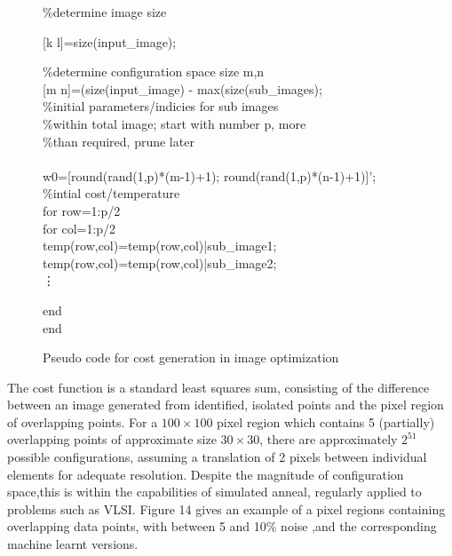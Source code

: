 \documentclass[12pt]{article}
\begin{document}
\begin{figure}
{\tt

\%determine image size

[k l]=size(input\_image);

\%determine configuration space size m,n\\

 [m n]=(size(input\_image) - max(size(sub\_images); \\

 
\%initial parameters/indicies for sub images \\
\%within total image; start with number p, more\\
\%than required, prune later\\
\\
w0=[round(rand(1,p)*(m-1)+1); round(rand(1,p)*(n-1)+1)]';\\

\%intial cost/temperature\\

for row=1:p/2 \\
	for col=1:p/2 \\

temp(row,col)=temp(row,col)|sub\_image1; \\
temp(row,col)=temp(row,col)|sub\_image2; \\
\vdots

end \\
end \\
}
\caption{Pseudo code for cost generation in image optimization}
\end{figure}






The cost function is a standard least squares sum, consisting of the difference between an image generated from identified, isolated points and the pixel region of overlapping points. For a $100\times 100$ pixel region which contains 5 (partially) overlapping points of approximate size $30\times 30$, there are approximately $2^{51}$ possible configurations, assuming a translation of 2 pixels between individual elements for adequate resolution. Despite the magnitude of configuration space,this is within the capabilities of simulated anneal, regularly applied to problems such as VLSI. Figure 14 gives an example of a pixel regions containing overlapping data points, with between 5 and 10\% noise ,and the corresponding machine learnt versions. 
\end{document}
